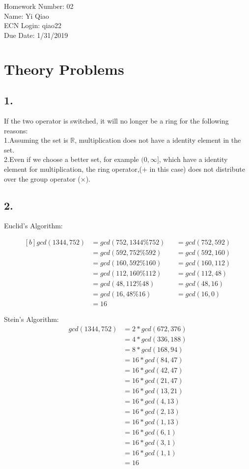 \documentclass[11pt]{article}
\begin{document}
\noindent Homework Number: 02\\
Name: Yi Qiao\\
ECN Login: qiao22\\
Due Date: 1/31/2019\\
\section*{Theory Problems}
\subsection*{1.} 
If the two operator is switched, it will no longer be a ring for the following reasons:\\
\indent1.Assuming the set is $\mathbb{R}$, multiplication does not have a identity element in the set.\\
\indent2.Even if we choose a better set, for example $(0,\infty]$, which have a identity element for multiplication, the ring operator,($+$ in this case) does not distribute over the group operator ($\times$).

\subsection*{2.}
\begin{multicols}{2}
	Euclid's Algorithm:

	\begin{equation}	
	\begin{aligned}[b]
	gcd(1344,752)&=gcd(752,1344\%752)&	&=gcd(752,592)\\
	&=gcd(592,752\%592)	&	&=gcd(592,160)\\
	&=gcd(160,592\%160)	&	&=gcd(160,112)\\
	&=gcd(112,160\%112)	&	&=gcd(112,48)\\
	&=gcd(48,112\%48)	&	&=gcd(48,16)\\
	&=gcd(16,48\%16)	&	&=gcd(16,0)\\
	&=16
	\end{aligned}
	\end{equation}
	
	Stein's Algorithm:
	\begin{equation}
	\begin{split}
	gcd(1344,752)&=2*gcd(672,376)\\
	&=4*gcd(336,188)\\
	&=8*gcd(168,94)\\
	&=16*gcd(84,47)\\
	&=16*gcd(42,47)\\
	&=16*gcd(21,47)\\
	&=16*gcd(13,21)\\
	&=16*gcd(4,13)\\
	&=16*gcd(2,13)\\
	&=16*gcd(1,13)\\
	&=16*gcd(6,1)\\
	&=16*gcd(3,1)\\
	&=16*gcd(1,1)\\
	&=16
	\end{split}
	\end{equation}
\end{multicols}
\pagebreak
\end{document}
